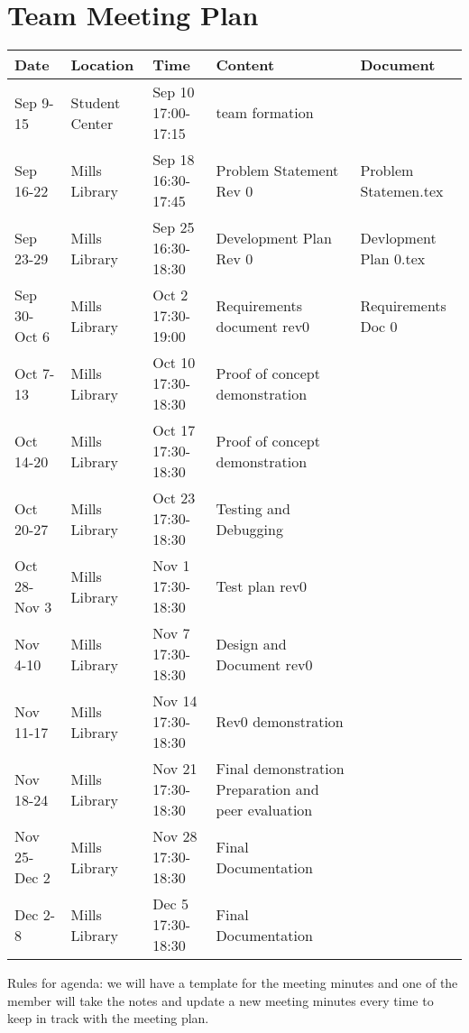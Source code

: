 \documentclass[10pt]{article}
\begin{document}
\section{Team Meeting Plan}
	\begin{center}
	\begin{tabular}{|p{1.5cm}|p{2.0cm}|p{2.5cm}|p{2.5cm}|p{2.5cm}|}
	\hline
	\textbf{Date} & \textbf{Location} & \textbf{Time} & \textbf{Content} & \textbf{Document}\\
	\hline
    Sep 9-15 & Student Center & Sep 10 17:00-17:15 & team formation & \\
    \hline
    Sep 16-22 & Mills Library & Sep 18 16:30-17:45& Problem Statement Rev 0& Problem Statemen.tex\\
      \hline
    Sep 23-29 & Mills Library & Sep 25 16:30-18:30& Development Plan Rev 0& Devlopment Plan 0.tex\\
      \hline
    Sep 30- Oct 6 & Mills Library & Oct 2 17:30-19:00& Requirements document rev0&Requirements Doc 0 \\
      \hline
    Oct 7-13 & Mills Library & Oct 10 17:30-18:30& Proof of concept demonstration& \\
      \hline
    Oct 14-20 & Mills Library & Oct 17 17:30-18:30 & Proof of concept demonstration& \\
      \hline
    Oct 20-27 & Mills Library & Oct 23 17:30-18:30 & Testing and Debugging& \\
      \hline
    Oct 28-Nov 3 & Mills Library & Nov 1 17:30-18:30 & Test plan rev0& \\
      \hline
    Nov 4-10 & Mills Library & Nov 7 17:30-18:30 & Design and Document rev0& \\
      \hline
    Nov 11-17 & Mills Library & Nov 14 17:30-18:30& Rev0 demonstration& \\
      \hline
    Nov 18-24 & Mills Library & Nov 21 17:30-18:30& Final demonstration Preparation and peer evaluation& \\
      \hline
    Nov 25-Dec 2 & Mills Library & Nov 28 17:30-18:30 & Final Documentation& \\
      \hline
    Dec 2-8 & Mills Library & Dec 5 17:30-18:30& Final Documentation& \\
      \hline
      
	\end{tabular}
	\end{center}
Rules for agenda: we will have a template for the meeting minutes and one of the member will take the notes and update a new meeting minutes every time to keep in track with the meeting plan.
\newpage
\end{document}
